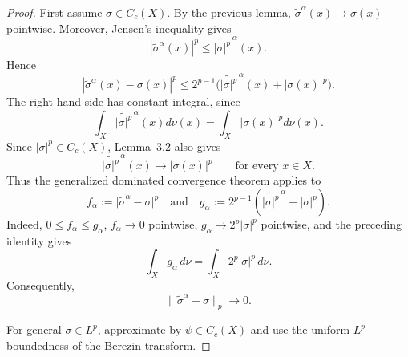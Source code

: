 \documentclass{amsart}
\theoremstyle{definition}
\theoremstyle{remark}
\numberwithin{equation}{section}
\begin{document}
\begin{proof}
First assume $\sigma \in C_c(X)$.
By the previous lemma,
$\widetilde{\sigma}^\alpha(x) \to \sigma(x)$ pointwise.
Moreover, Jensen’s inequality gives
\[
    |\widetilde{\sigma}^\alpha(x)|^p
    \le
    \widetilde{|\sigma|^p}^{\,\alpha}(x).
\]
Hence
\[
    |\widetilde{\sigma}^\alpha(x)-\sigma(x)|^p
    \le
    2^{p-1}
    \big(
        \widetilde{|\sigma|^p}^{\,\alpha}(x)
        + |\sigma(x)|^p
    \big).
\]
The right-hand side has constant integral,
since
\[
    \int_X
    \widetilde{|\sigma|^p}^{\,\alpha}(x)
    d\nu(x)
    =
    \int_X |\sigma(x)|^p d\nu(x).
\]
Since $|\sigma|^p\in C_c(X)$, Lemma~3.2 also gives
\[
\widetilde{|\sigma|^p}^{\,\alpha}(x)\longrightarrow |\sigma(x)|^p
\qquad\text{for every }x\in X.
\]
Thus the generalized dominated convergence theorem applies to
\[
f_\alpha:=\bigl|\widetilde{\sigma}^{\alpha}-\sigma\bigr|^p
\quad\text{and}\quad
g_\alpha:=2^{p-1}\left(
\widetilde{|\sigma|^p}^{\,\alpha}+|\sigma|^p
\right).
\]
Indeed, $0\leq f_\alpha\leq g_\alpha$, $f_\alpha\to0$ pointwise,
$g_\alpha\to2^p|\sigma|^p$ pointwise, and the preceding identity gives
\[
\int_X g_\alpha\,d\nu
=
\int_X 2^p|\sigma|^p\,d\nu.
\]
Consequently,
\[
\bigl\|\widetilde{\sigma}^{\alpha}-\sigma\bigr\|_p\longrightarrow0.
\]

For general $\sigma \in L^p$,
approximate by $\psi \in C_c(X)$ and use
the uniform $L^p$ boundedness of the Berezin transform.
\end{proof}
\end{document}
